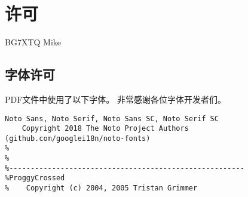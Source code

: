 \chapter*{许可}

\noindent {} BG7XTQ Mike

\section*{字体许可}

\noindent PDF文件中使用了以下字体。
非常感谢各位字体开发者们。

\begin{lstlisting}[numbers=none]
Noto Sans, Noto Serif, Noto Sans SC, Noto Serif SC
    Copyright 2018 The Noto Project Authors (github.com/googlei18n/noto-fonts)
%
%
%-------------------------------------------------------
%ProggyCrossed
%    Copyright (c) 2004, 2005 Tristan Grimmer
\end{lstlisting}
